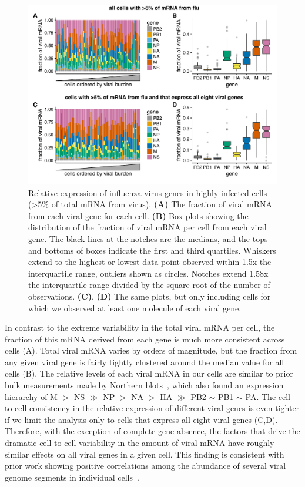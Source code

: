 \documentclass[9pt,lineno]{elife}
\begin{document}
\begin{figure}
\centerline{\includegraphics[width=0.9\linewidth]{figures/p_flu_expr_manualedits.pdf}}
\caption{\label{fig:fluexpr}
Relative expression of influenza virus genes in highly infected cells (>5\% of total mRNA from virus).
{\bf (A)} 
The fraction of viral mRNA from each viral gene for each cell. 
{\bf (B)}
Box plots showing the distribution of the fraction of viral mRNA per cell from each viral gene.
The black lines at the notches are the medians, and the tops and bottoms of boxes indicate the first and third quartiles.
Whiskers extend to the highest or lowest data point observed within 1.5x the interquartile range, outliers shown as circles.
Notches extend 1.58x the interquartile range divided by the square root of the number of observations. 
{\bf (C)}, {\bf (D)} 
The same plots, but only including cells for which we observed at least one molecule of each viral gene.
}
\end{figure}

In contrast to the extreme variability in the total viral mRNA per cell, the fraction of this mRNA derived from each gene is much more consistent across cells (A).
Total viral mRNA varies by orders of magnitude, but the fraction from any given viral gene is fairly tightly clustered around the median value for all cells (B).
The relative levels of each viral mRNA in our cells are similar to prior bulk measurements made by Northern blots~\citep{hatada1989control}, which also found an expression hierarchy of M $>$ NS $\gg$ NP $>$ NA $>$ HA $\gg$ PB2 $\sim$ PB1 $\sim$ PA.
The cell-to-cell consistency in the relative expression of different viral genes is even tighter if we limit the analysis only to cells that express all eight viral genes (C,D).
Therefore, with the exception of complete gene absence, the factors that drive the dramatic cell-to-cell variability in the amount of viral mRNA have roughly similar effects on all viral genes in a given cell.
This finding is consistent with prior work showing positive correlations among the abundance of several viral genome segments in individual cells~\citep{Heldt:2015iz}.
\end{document}

